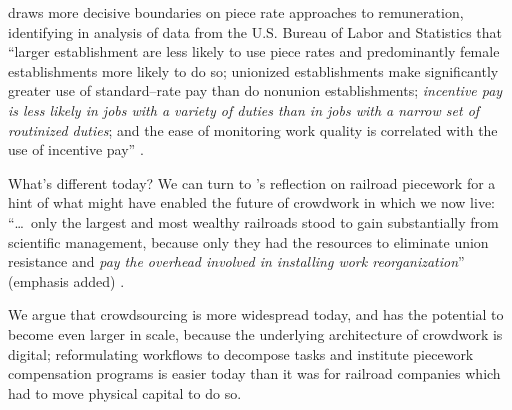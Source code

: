 \documentclass[trackingWork]{subfiles}
\begin{document}
\citeauthor{Brown01041990} draws more decisive boundaries on piece rate approaches to remuneration,
identifying in analysis of data from
the U.S. Bureau of Labor and Statistics that
``larger establishment are less likely to use piece rates and predominantly female establishments more likely to do so; unionized establishments make significantly greater use of standard--rate pay than do nonunion establishments; \textit{incentive pay is less likely in jobs with a variety of duties than in jobs with a narrow set of routinized duties}; and the ease of monitoring work quality is correlated with the use of incentive pay''
\cite{Brown01041990}.


What's different today? We can turn to \citeauthor{10.2307/23702539}'s reflection on railroad piecework
for a hint of what might have enabled the future of crowdwork in which we now live:
``\dots~only the largest and most wealthy railroads stood to gain substantially from scientific management,
because only they had the resources to eliminate union resistance and
\textit{pay the overhead involved in installing work reorganization}''
(emphasis added)
\cite{10.2307/23702539}.

We argue that crowdsourcing is more widespread today,
and has the potential to become even larger in scale,
because the underlying architecture of crowdwork is digital;
reformulating workflows to decompose tasks and institute piecework compensation programs
is easier today than it was for railroad companies which had to move physical capital to do so.






%                                                                                
\end{document}

